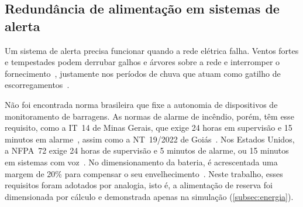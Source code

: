 \subsection{Redundância de alimentação em sistemas de alerta}
\label{subsec:rev_redundancia_alimentacao}

Um sistema de alerta precisa funcionar quando a rede elétrica falha.
Ventos fortes e tempestades podem derrubar galhos e árvores sobre a rede
e interromper o fornecimento~\cite[p.~10]{aneel2024nt90}, justamente nos
períodos de chuva que atuam como gatilho de escorregamentos~\cite{bogaard2018hydrological}.

Não foi encontrada norma brasileira que fixe a autonomia de dispositivos
de monitoramento de barragens. As normas de alarme de incêndio, porém,
têm esse requisito, como a IT~14 de Minas Gerais, que exige 24 horas em supervisão
e 15 minutos em alarme~\cite[item~5.3]{cbmmg2017it14}, assim como a
NT~19/2022 de Goiás~\cite[item~5.3]{cbmgo2022nt19}.
Nos Estados Unidos, a NFPA~72 exige 24 horas de supervisão e 5 minutos
de alarme, ou 15 minutos em sistemas com voz~\cite{hammerberg2021calculation, reiswig2023nfpa72}. No dimensionamento
da bateria, é acrescentada uma margem de 20\% para compensar o seu
envelhecimento~\cite{hammerberg2021calculation}.
Neste trabalho, esses requisitos foram adotados por analogia, isto é, a alimentação de reserva foi dimensionada por cálculo e demonstrada apenas
na simulação (\autoref{subsec:energia}).
